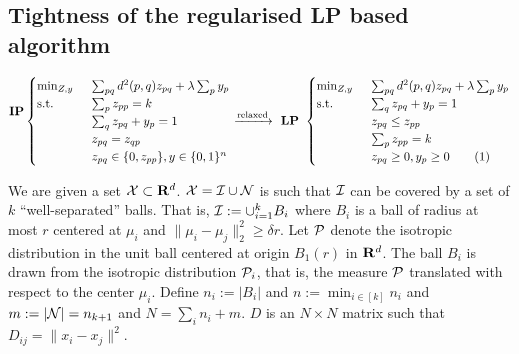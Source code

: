 \subsection{Tightness of the regularised LP based algorithm}
\begin{equation*}
  \begin{split}
	\textbf{IP}\\
	\textbf{}
  \end{split}
  \begin{cases}
		\min_{Z, y} \enspace &\sum_{pq}d^2(p, q)z_{pq} + \lambda \sum_p y_p\\
		\text{s.t. } \enspace &\sum_{p}z_{pp}= k\\
		& \sum_{q}z_{pq} + y_p = 1\\	
		&z_{pq} = z_{qp} \\
		& z_{pq} \in \{0, z_{pp}\}, y \in \{0, 1\}^n
	\end{cases}
	\xrightarrow{\text{relaxed}} \textbf{ LP } 
	\begin{cases}
		\min_{Z, y} \enspace &\sum_{pq}d^2(p, q)z_{pq} + \lambda \sum_p y_p\\
        \text{s.t. } &\sum_{q}z_{pq} + y_p = 1\\
		& z_{pq} \le z_{pp}\\
		& \sum_{p} z_{pp} = k\\		
		& z_{pq} \ge 0, y_p \ge 0 \numberthis\label{a-eqn:regularisedLP}
	\end{cases}
\end{equation*}

We are given a set $\mathcal X \subset \mathbf R^d$. $\mathcal X = \mathcal I \cup \mathcal N$ is such that $\mathcal I$ can be covered by a set of $k$ ``well-separated'' balls. That is, $\mathcal I := \cup_{i=1}^k B_i$ where $B_i$ is a ball of radius at most $r$ centered at $\mu_i$ and $\|\mu_i - \mu_j\|_{2}^{2} \ge \delta r$. Let $\mathcal P$ denote the isotropic distribution in the unit ball centered at origin $B_1(r)$ in $\mathbf R^d$. The ball $B_i$ is drawn from the isotropic distribution $\mathcal P_i$, that is, the measure $\mathcal P$ translated with respect to the center $\mu_i$. Define $n_i := |B_i|$ and $n := \min_{i\in[k]} n_i$ and $m := |\mathcal N| = n_{k+1}$ and $N = \sum_i n_i + m$. $D$ is an $N\times N$ matrix such that $D_{ij} = \|x_i -x_j\|^2$.

